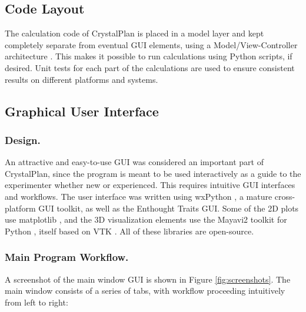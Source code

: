 \documentclass[final]{iucr}              %
\begin{document}
\subsection{Code Layout}

The calculation code of CrystalPlan is placed in a model layer and kept
completely separate from eventual GUI elements, using a Model/View-Controller
architecture \cite{Gamma95}. This makes it possible to run calculations using
Python scripts, if desired. Unit tests for each part of the calculations are used to ensure
consistent results on different platforms and  systems.     
  

\subsection{Graphical User Interface}

\subsubsection{Design.}

An attractive and easy-to-use GUI was considered an important part of
CrystalPlan, since the program is meant to be used interactively as a guide to
the experimenter whether new or experienced. This requires intuitive GUI
interfaces and workflows.
The user interface was written using wxPython
\cite{wxPython}, a mature cross-platform GUI toolkit, as well as the Enthought
Traits GUI. Some of the 2D plots use matplotlib \cite{matplotlib},  and the 3D
visualization elements use the Mayavi2 toolkit for Python \cite{mayavi}, itself
based on VTK \cite{VTK}. All of these libraries are  open-source.

\subsubsection{Main Program Workflow.}
A screenshot of the main window GUI is shown in Figure \ref{fig:screenshots}.
The main window consists of a series of tabs, with workflow proceeding
intuitively from left to right:
\end{document}
